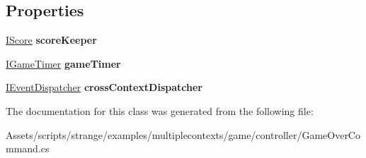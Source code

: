 \subsection*{Properties}
\begin{DoxyCompactItemize}
\item 
\hypertarget{classstrange_1_1examples_1_1multiplecontexts_1_1game_1_1_game_over_command_af938e7b944c36db01924503fd1ac7c8e}{\hyperlink{interfacestrange_1_1examples_1_1multiplecontexts_1_1game_1_1_i_score}{I\-Score} {\bfseries score\-Keeper}}\label{classstrange_1_1examples_1_1multiplecontexts_1_1game_1_1_game_over_command_af938e7b944c36db01924503fd1ac7c8e}

\item 
\hypertarget{classstrange_1_1examples_1_1multiplecontexts_1_1game_1_1_game_over_command_a57ebf77d4cc93c4b102488b994bbe9f2}{\hyperlink{interfacestrange_1_1examples_1_1multiplecontexts_1_1game_1_1_i_game_timer}{I\-Game\-Timer} {\bfseries game\-Timer}}\label{classstrange_1_1examples_1_1multiplecontexts_1_1game_1_1_game_over_command_a57ebf77d4cc93c4b102488b994bbe9f2}

\item 
\hypertarget{classstrange_1_1examples_1_1multiplecontexts_1_1game_1_1_game_over_command_a8acad08e0790cdfc83877c979263342e}{\hyperlink{interfacestrange_1_1extensions_1_1dispatcher_1_1eventdispatcher_1_1api_1_1_i_event_dispatcher}{I\-Event\-Dispatcher} {\bfseries cross\-Context\-Dispatcher}}\label{classstrange_1_1examples_1_1multiplecontexts_1_1game_1_1_game_over_command_a8acad08e0790cdfc83877c979263342e}

\end{DoxyCompactItemize}


The documentation for this class was generated from the following file\-:\begin{DoxyCompactItemize}
\item 
Assets/scripts/strange/examples/multiplecontexts/game/controller/Game\-Over\-Command.\-cs\end{DoxyCompactItemize}
